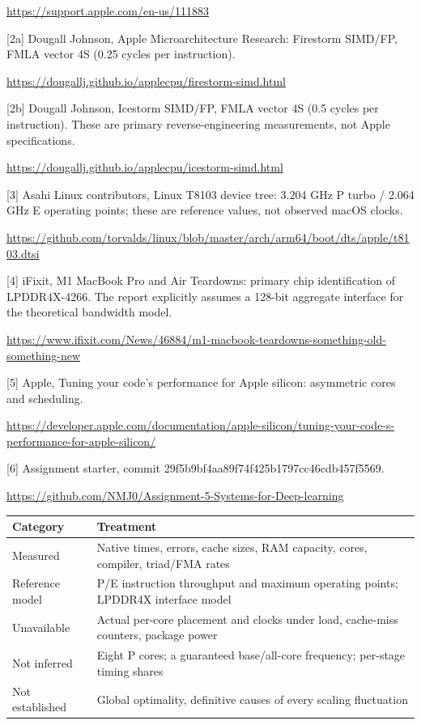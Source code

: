\documentclass[10pt,a4paper]{article}
\newcommand{\question}[1]{\vspace{1mm}{\large\bfseries #1}\par\vspace{1mm}}
\begin{document}
\url{https://support.apple.com/en-us/111883}

[2a] Dougall Johnson, Apple Microarchitecture Research: Firestorm SIMD/FP, FMLA vector 4S (0.25 cycles per instruction).

\url{https://dougallj.github.io/applecpu/firestorm-simd.html}

[2b] Dougall Johnson, Icestorm SIMD/FP, FMLA vector 4S (0.5 cycles per instruction). These are primary reverse-engineering measurements, not Apple specifications.

\url{https://dougallj.github.io/applecpu/icestorm-simd.html}

[3] Asahi Linux contributors, Linux T8103 device tree: 3.204 GHz P turbo / 2.064 GHz E operating points; these are reference values, not observed macOS clocks.

\url{https://github.com/torvalds/linux/blob/master/arch/arm64/boot/dts/apple/t8103.dtsi}

[4] iFixit, M1 MacBook Pro and Air Teardowns: primary chip identification of LPDDR4X-4266. The report explicitly assumes a 128-bit aggregate interface for the theoretical bandwidth model.

\url{https://www.ifixit.com/News/46884/m1-macbook-teardowns-something-old-something-new}

[5] Apple, Tuning your code's performance for Apple silicon: asymmetric cores and scheduling.

\url{https://developer.apple.com/documentation/apple-silicon/tuning-your-code-s-performance-for-apple-silicon/}

[6] Assignment starter, commit 29f5b9bf4aa89f74f425b1797cc46cdb457f5569.

\url{https://github.com/NMJ0/Assignment-5-Systems-for-Deep-learning}


\question{What is measured, assumed or unavailable}
\begin{center}
\footnotesize
\begin{tabular}{lp{111mm}}
\toprule
Category & Treatment \\
\midrule
Measured & Native times, errors, cache sizes, RAM capacity, cores, compiler, triad/FMA rates \\
Reference model & P/E instruction throughput and maximum operating points; LPDDR4X interface model \\
Unavailable & Actual per-core placement and clocks under load, cache-miss counters, package power \\
Not inferred & Eight P cores; a guaranteed base/all-core frequency; per-stage timing shares \\
Not established & Global optimality, definitive causes of every scaling fluctuation \\
\bottomrule
\end{tabular}
\end{center}
\end{document}
